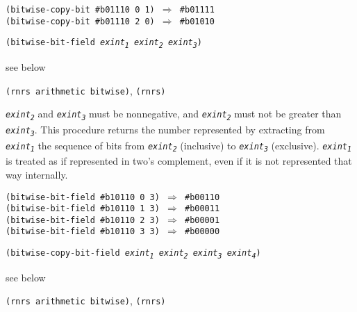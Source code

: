 \begin{alltt}
(bitwise-copy-bit \#{}b01110 0 1) \(\Rightarrow\) \#{}b01111
(bitwise-copy-bit \#{}b01110 2 0) \(\Rightarrow\) \#{}b01010
\end{alltt}

\begin{description}

\label{objects_s141}\item[procedure] \texttt{(bitwise-bit-field \textit{exint\textsubscript{1}} \textit{exint\textsubscript{2}} \textit{exint\textsubscript{3}})}



\item[returns] see below


\item[libraries] \texttt{(rnrs arithmetic bitwise)}, \texttt{(rnrs)}
\end{description}

\texttt{\textit{exint\textsubscript{2}}} and \texttt{\textit{exint\textsubscript{3}}} must be nonnegative,
and \texttt{\textit{exint\textsubscript{2}}} must not be greater than \texttt{\textit{exint\textsubscript{3}}}.
This procedure returns the number represented by extracting from \texttt{\textit{exint\textsubscript{1}}}
the sequence of bits from \texttt{\textit{exint\textsubscript{2}}} (inclusive) to \texttt{\textit{exint\textsubscript{3}}} (exclusive).
\texttt{\textit{exint\textsubscript{1}}} is treated as if represented in two's complement, even
if it is not represented that way internally.

\begin{alltt}
(bitwise-bit-field \#{}b10110 0 3) \(\Rightarrow\) \#{}b00110
(bitwise-bit-field \#{}b10110 1 3) \(\Rightarrow\) \#{}b00011
(bitwise-bit-field \#{}b10110 2 3) \(\Rightarrow\) \#{}b00001
(bitwise-bit-field \#{}b10110 3 3) \(\Rightarrow\) \#{}b00000
\end{alltt}

\begin{description}

\label{objects_s142}\item[procedure] \texttt{(bitwise-copy-bit-field \textit{exint\textsubscript{1}} \textit{exint\textsubscript{2}} \textit{exint\textsubscript{3}} \textit{exint\textsubscript{4}})}



\item[returns] see below


\item[libraries] \texttt{(rnrs arithmetic bitwise)}, \texttt{(rnrs)}
\end{description}

